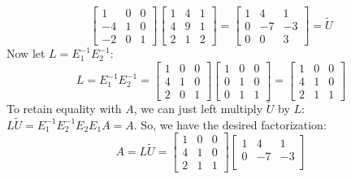 \documentclass[11pt]{article}
\begin{document}
\begin{exercise}{3}
{\begin{enumerate}[label=(\alph*)]
$$\begin{bmatrix}
                1 & 0 & 0 \\
                -4 & 1 & 0 \\
                -2 & 0 & 1
            \end{bmatrix}
            \begin{bmatrix}
                1 & 4 & 1 \\
                4 & 9 & 1 \\
                2 & 1 & 2
            \end{bmatrix}
            =
            \begin{bmatrix}
                1 & 4 & 1 \\
                0 & -7 & -3 \\
                0 & 0 & 3
            \end{bmatrix}
            = \tilde{U}
            $$
            Now let $L = E_1^{-1} E_2^{-1}$:
            $$ L = E_1^{-1} E_2^{-1} =
            \begin{bmatrix}
                1 & 0 & 0 \\
                4 & 1 & 0 \\
                2 & 0 & 1
            \end{bmatrix}
            \begin{bmatrix}
                1 & 0 & 0 \\
                0 & 1 & 0 \\
                0 & 1 & 1
            \end{bmatrix}
            =
            \begin{bmatrix}
                1 & 0 & 0 \\
                4 & 1 & 0 \\
                2 & 1 & 1
            \end{bmatrix}
            $$
            To retain equality with $A$, we can just left multiply $\tilde{U}$ by $L$: $L\tilde{U} = E_1^{-1} E_2^{-1} E_2 E_1 A = A$.
            So, we have the desired factorization:
            $$ A = L \tilde{U} =
            \begin{bmatrix}
                1 & 0 & 0 \\
                4 & 1 & 0 \\
                2 & 1 & 1
            \end{bmatrix}
            \begin{bmatrix}
                1 & 4 & 1 \\
                0 & -7 & -3 \\

\end{bmatrix}$$
\end{enumerate}}
\end{exercise}
\end{document}
